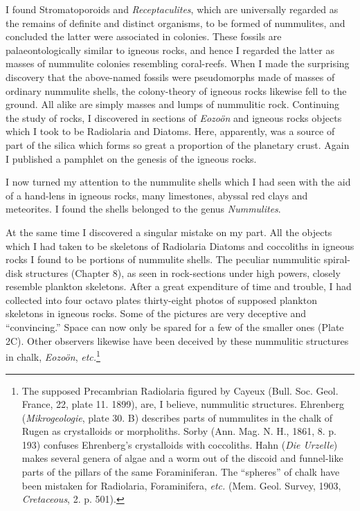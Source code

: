 \documentclass[a4paper, 12pt, oneside]{article}
\begin{document}
I found Stromatoporoids and \emph{Receptaculites}, which are universally regarded as the remains of definite and distinct organisms, to be formed of nummulites, and concluded the latter were associated in colonies. These fossils are palaeontologically similar to igneous rocks, and hence I regarded the latter as masses of nummulite colonies resembling coral-reefs. When I made the surprising discovery that the above-named fossils were pseudomorphs made of masses of ordinary nummulite shells, the colony-theory of igneous rocks likewise fell to the ground. All alike are simply masses and lumps of nummulitic rock. Continuing the study of rocks, I discovered in sections of \emph{Eozoön} and igneous rocks objects which I took to be Radiolaria and Diatoms. Here, apparently, was a source of part of the silica which forms so great a proportion of the planetary crust. Again I published a pamphlet on the genesis of the igneous rocks.

I now turned my attention to the nummulite shells which I had seen with the aid of a hand-lens in igneous rocks, many limestones, abyssal red clays and meteorites. I found the shells belonged to the genus \emph{Nummulites}.

At the same time I discovered a singular mistake on my part. All the objects which I had taken to be skeletons of Radiolaria Diatoms and coccoliths in igneous rocks I found to be portions of nummulite shells. The peculiar nummulitic spiral-disk structures (Chapter 8), as seen in rock-sections under high powers, closely resemble plankton skeletons. After a great expenditure of time and trouble, I had collected into four octavo plates thirty-eight photos of supposed plankton skeletons in igneous rocks. Some of the pictures are very deceptive and ``convincing.'' Space can now only be spared for a few of the smaller ones (Plate 2C). Other observers likewise have been deceived by these nummulitic structures in chalk, \emph{Eozoön}, \emph{etc.}\footnote{The supposed Precambrian Radiolaria figured by Cayeux (Bull. Soc. Geol. France, 22, plate 11. 1899), are, I believe, nummulitic structures. Ehrenberg (\emph{Mikrogeologie}, plate 30. B) describes parts of nummulites in the chalk of Rugen as crystalloids or morpholiths. Sorby (Ann. Mag. N. H., 1861, 8. p. 193) confuses Ehrenberg's crystalloids with coccoliths. Hahn (\emph{Die Urzelle}) makes several genera of algae and a worm out of the discoid and funnel-like parts of the pillars of the same Foraminiferan. The ``spheres'' of chalk have been mistaken for Radiolaria, Foraminifera, \emph{etc.} (Mem. Geol. Survey, 1903, \emph{Cretaceous}, 2. p. 501).}
\end{document}
